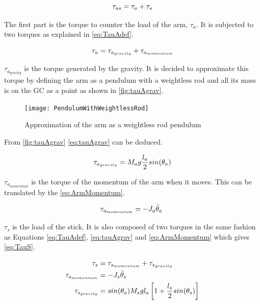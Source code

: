 \begin{equation}\label{eq:TauasBegin}
	\tau_{as}=\tau_a+\tau_s \addunit{\newton\meter}
\end{equation}
\startexplain
{}
\stopexplain

The first part is the torque to counter the load of the arm, $\tau_a$. It is subjected to two torques as explained in \autoref{eq:TauAdef}.

\begin{equation}\label{eq:TauAdef}
	\tau_a=\tau_{a_{gravity}}+\tau_{a_{momentum}} \addunit{\newton\meter}
\end{equation}

 $\tau_{a_{gravity}}$ is the torque generated by the gravity. It is decided to approximate this torque by defining the arm as a pendulum with a weightless rod and all its mass is on the GC as a point as shown in \autoref{fig:tauAgrav}.
 
 \begin{figure}[htbp]
 	\centering
 	\texttt{[image: PendulumWithWeightlessRod]}
 	\caption{Approximation of the arm as a weightless rod pendulum}\label{fig:tauAgrav}
 \end{figure}
 
 From \autoref{fig:tauAgrav} \autoref{eq:tauAgrav} can be deduced.

\begin{equation}\label{eq:tauAgrav}
	\tau_{a_{gravity}}=M_a g \frac{l_a}{2} sin(\theta_a) \addunit{\newton\meter}
\end{equation}
\startexplain
{}
\stopexplain

$\tau_{a_{momentum}}$ is the torque of the momentum of the arm when it moves. This can be translated by the \autoref{eq:ArmMomentum}.

\begin{equation}\label{eq:ArmMomentum}
	\tau_{a_{momentum}}=-J_a \ddot\theta_a\ \addunit{\newton\meter}
\end{equation}
\startexplain
{}
\stopexplain

$\tau_s$ is the load of the stick. It is also composed of two torques in the same fashion as Equations \eqref{eq:TauAdef}, \eqref{eq:tauAgrav} and \eqref{eq:ArmMomentum} which gives \autoref{eq:TauS}.

\begin{subequations}\label{eq:TauS}
	\begin{flalign}
		\tau_s&=\tau_{s_{momentum}}+\tau_{s_{gravity}} \addunit{\newton\meter}\\
		\tau_{s_{momentum}}&=-J_s \ddot\theta_s\ \addunit{\newton\meter}\label{eq:TausMomentum}\\
		\tau_{s_{gravity}}&=sin(\theta_a)M_s g l_a \left[1+\frac{l_s}{2}sin(\theta_s)\right] \addunit{\newton\meter}		
	\end{flalign}
\end{subequations}


